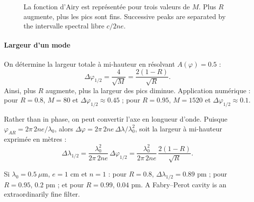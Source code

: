 \begin{figure}[h!]
  \centering
  \caption*{\footnotesize La fonction d'Airy est représentée pour trois valeurs
  de $M$. Plus $R$ augmente, plus les pics sont fins. Successive peaks are
  separated by the intervalle spectral libre $c/2ne$.}
\end{figure}

\paragraph{Largeur d'un mode}
On détermine la largeur totale à mi-hauteur en résolvant $A(\varphi)=0.5$ :
\[\Delta\varphi_{1/2}=\frac{4}{\sqrt{M}}=\frac{2(1-R)}{\sqrt{R}}.\]
Ainsi, plus $R$ augmente, plus la largeur des pics diminue. Application
numérique : pour $R=0.8$, $M=80$ et $\Delta\varphi_{1/2}\approx 0.45$ ; pour
$R=0.95$, $M=1520$ et $\Delta\varphi_{1/2}\approx 0.1$.

Rather than in phase, on peut convertir l'axe en longueur d'onde. Puisque
$\varphi_{AR}=2\pi\,2ne/\lambda_0$, alors
$\Delta\varphi=2\pi\,2ne\,\Delta\lambda/\lambda_0^2$, soit la largeur à
mi-hauteur exprimée en mètres :
\[\Delta\lambda_{1/2}=\frac{\lambda_0^2}{2\pi\,2ne}\,\Delta\varphi_{1/2}
  =\frac{\lambda_0^2}{2\pi\,2ne}\,\frac{2(1-R)}{\sqrt{R}}.\]

\begin{example}
  Si $\lambda_0=0.5\ \mu$m, $e=1$ cm et $n=1$ : pour $R=0.8$,
  $\Delta\lambda_{1/2}=0.89$ pm ; pour $R=0.95$, $0.2$ pm ; et pour $R=0.99$,
  $0.04$ pm. A Fabry--Perot cavity is an extraordinarily fine filter.
\end{example}

